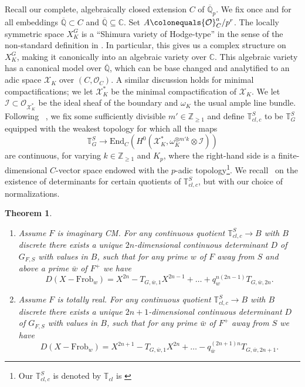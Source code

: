 \documentclass{amsart}
\newtheorem{thm}[subsubsection]{Theorem}
\theoremstyle{remark}
\numberwithin{equation}{subsection}
\def\C{\CC}
\newcommand{\Q}{\QQ}
\newcommand{\Z}{\ZZ}
\newcommand{\CC}{{\mathbb C}}
\newcommand{\QQ}{{\mathbb Q}}
\newcommand{\ZZ}{{\mathbb Z}}
\newcommand{\cI}{{\mathcal I}}
\newcommand{\cO}{{\mathcal O}}
\newcommand{\cX}{{\mathcal X}}
\newcommand{\ol}{\overline}
\newcommand{\sub}{\subseteq}
\newcommand{\defeq}{\colonequals}
\renewcommand{\(}{\left(}
\renewcommand{\)}{\right)}
\begin{document}
\medskip

Recall our complete, algebraically closed extension $C$ of $\overline{\Q}_p$. We fix once and for all embeddings $\overline{\Q}\subset C$ and $\ol{\Q}\sub \C$. Set $A\defeq \cO_C^a/p^r$. The locally symmetric space $X^{G}_K$ is a ``Shimura variety of Hodge-type'' in the sense of the non-standard definition in \cite[\S 4, Introduction]{scholze-galois}. In particular, this gives us a complex structure on $X_K^G$, making it canonically into an algebraic variety over $\C$. This algebraic variety has a canonical model over $\overline{\Q}$, which can be base changed and analytified to an adic space $\cX_K$ over $(C,\cO_C)$. A similar discussion holds for minimal compactifications; we let $\cX^{*}_{K}$ be the minimal compactification of $\cX_K$. We let $\cI\subset \cO_{\cX^*_{K}}$ be the ideal sheaf of the boundary and $\omega_K$ the usual ample line bundle. Following ~\cite[Thm. 4.3.1]{scholze-galois}, we fix some sufficiently divisible $m'\in \Z_{\geq 1}$ and define $\mathbb{T}^S_{cl,c}$ to be $\mathbb{T}^S_G$ equipped with the weakest topology for which all the maps
\[
\mathbb{T}^S_G \to \mathrm{End}_C\left(H^0\left(\cX^*_{K}, \omega_{K}^{\otimes m'k}\otimes \cI\right)\right) 
\] 
are continuous, for varying $k\in \Z_{\geq 1}$ and $K_p$, where the right-hand side is a finite-dimensional $C$-vector space endowed with the $p$-adic topology\footnote{Our $\mathbb{T}^S_{cl,c}$ is denoted by $\mathbb{T}_{cl}$ is \cite{scholze-galois}}. We recall~\cite[Cor. 5.1.11]{scholze-galois} on the existence of determinants for certain quotients of $\mathbb{T}^S_{cl,c}$, but with our choice of normalizations.

\begin{thm}\label{existence of determinant} \leavevmode
\begin{enumerate}%
\item Assume $F$ is imaginary CM. For any continuous quotient $\mathbb{T}^S_{cl,c}\to B$ with $B$ discrete there exists a unique $2n$-dimensional continuous determinant $D$ of $G_{F,S}$ with values in $B$, such that for any prime $w$ of $F$ away from $S$ and above a prime $\bar{w}$ of $F^+$ we have
\[
D(X-\mathrm{Frob}_{w}) = X^{2n} - T_{G, \bar{w}, 1}X^{2n-1}+\dots +q^{n(2n-1)}_w T_{G,\bar{w},2n}.
\]
\item  Assume $F$ is totally real. For any continuous quotient $\mathbb{T}^S_{cl,c}\to B$ with $B$ discrete there exists a unique $2n+1$-dimensional continuous determinant $D$ of $G_{F,S}$ with values in $B$, such that for any prime $\bar{w}$ of $F^+$ away from $S$ we have
\[
D(X-\mathrm{Frob}_{w}) = X^{2n+1} - T_{G, \bar{w}, 1}X^{2n}+\dots -q^{(2n+1)n}_{\bar{w}} T_{G,\bar{w},2n+1}.
\]
\end{enumerate}
\end{thm}
\end{document}
